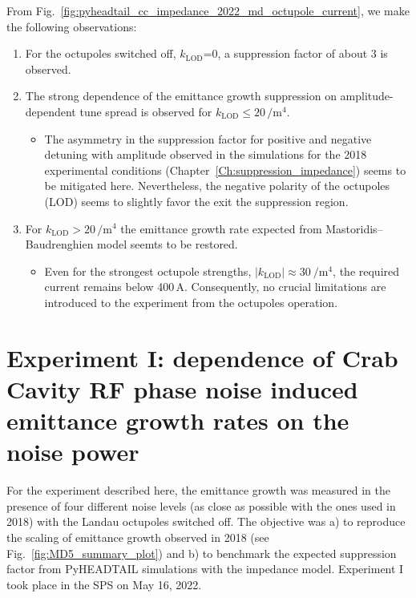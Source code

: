 From Fig.~\ref{fig:pyheadtail_cc_impedance_2022_md_octupole_current}, we make the following observations:
\begin{enumerate}
   \item For the octupoles switched off, $k_\mathrm{LOD}$=0, a suppression factor of about 3 is observed.
   \item The strong dependence of the emittance growth suppression on amplitude-dependent tune spread is observed for $k_\mathrm{LOD} \leq 20$\,$\mathrm{/m^4}$.
      \begin{itemize}
         \item The asymmetry in the suppression factor for positive and negative detuning with amplitude observed in the simulations for the 2018 experimental conditions (Chapter~\ref{Ch:suppression_impedance}) seems to be mitigated here. Nevertheless, the negative polarity of the octupoles (LOD) seems to slightly favor the exit the suppression region.
      \end{itemize}
   \item For $k_\mathrm{LOD} > 20$\,$\mathrm{/m^4}$ the emittance growth rate expected from Mastoridis--Baudrenghien model seemts to be restored. 
      \begin{itemize}
         \item Even for the strongest octupole strengths, $| k_\mathrm{LOD} |\approx 30 \ \mathrm{/m^4}$, the required current remains below 400\,A. Consequently, no crucial limitations are introduced to the experiment from the octupoles operation.
      \end{itemize}
\end{enumerate}

\section{Experiment I: dependence of Crab Cavity RF phase noise induced emittance growth rates on the noise power}\label{subsec:cc_md_2022_noise_scan} 

For the experiment described here, the emittance growth was measured in the presence of four different noise levels (as close as possible with the ones used in 2018) with the Landau octupoles switched off. The objective was a) to reproduce the scaling of emittance growth observed in 2018 (see Fig.~\ref{fig:MD5_summary_plot}) and b) to benchmark the expected suppression factor from PyHEADTAIL simulations with the impedance model. Experiment I took place in the SPS on May 16, 2022.

